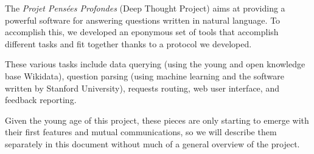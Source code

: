 The {\em Projet Pensées Profondes} (Deep Thought Project) aims at
providing a powerful software for answering questions written in
natural language.
To accomplish this, we developed an eponymous set of tools that
accomplish different tasks and fit together thanks to a protocol
we developed.

These various tasks include data querying (using the young and open
knowledge base Wikidata), question parsing (using machine learning and the
\CoreNLP software written by Stanford University),
requests routing, web user interface, and feedback reporting.

Given the young age of this project, these pieces are only starting
to emerge with their first features and mutual communications,
so we will describe them separately in this document without
much of a general overview of the project.
